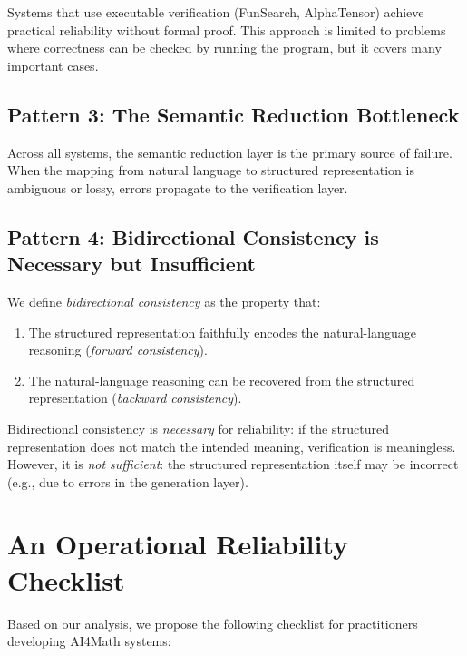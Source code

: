 \documentclass[11pt,a4paper]{article}
\begin{document}
Systems that use executable verification (FunSearch, AlphaTensor) achieve practical reliability without formal proof. This approach is limited to problems where correctness can be checked by running the program, but it covers many important cases.

\subsection{Pattern 3: The Semantic Reduction Bottleneck}

Across all systems, the semantic reduction layer is the primary source of failure. When the mapping from natural language to structured representation is ambiguous or lossy, errors propagate to the verification layer.

\subsection{Pattern 4: Bidirectional Consistency is Necessary but Insufficient}

We define \emph{bidirectional consistency} as the property that:
\begin{enumerate}
  \item The structured representation faithfully encodes the natural-language reasoning (\emph{forward consistency}).
  \item The natural-language reasoning can be recovered from the structured representation (\emph{backward consistency}).
\end{enumerate}

Bidirectional consistency is \emph{necessary} for reliability: if the structured representation does not match the intended meaning, verification is meaningless. However, it is \emph{not sufficient}: the structured representation itself may be incorrect (e.g., due to errors in the generation layer).

\section{An Operational Reliability Checklist}
\label{sec:checklist}

Based on our analysis, we propose the following checklist for practitioners developing AI4Math systems:
\end{document}
